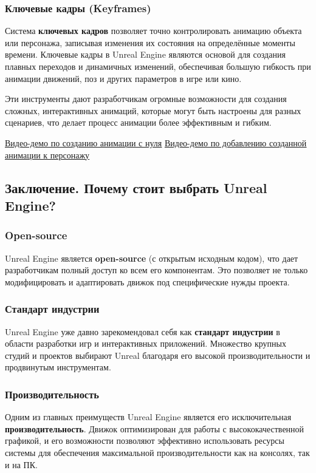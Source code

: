 \subsubsection{Ключевые кадры (Keyframes)}
Система \textbf{ключевых кадров} позволяет точно контролировать анимацию объекта или персонажа, записывая изменения их состояния на определённые моменты времени. Ключевые кадры в Unreal Engine являются основой для создания плавных переходов и динамичных изменений, обеспечивая большую гибкость при анимации движений, поз и других параметров в игре или кино.

Эти инструменты дают разработчикам огромные возможности для создания сложных, интерактивных анимаций, которые могут быть настроены для разных сценариев, что делает процесс анимации более эффективным и гибким.

\href{https://drive.google.com/file/d/1hCq_oF2frF_jmGwil24nNf5JegSw5t2a/view?usp=drive_link}{\underline{Видео-демо по созданию анимации с нуля}}
\newline
\href{https://drive.google.com/file/d/1bpvySAOp3d32BuroTV2EeSUZdUUCpDe9/view?usp=drive_link}{\underline{Видео-демо по добавлению созданной анимации к персонажу}}

\subsection{Заключение. Почему стоит выбрать Unreal Engine?}

\subsubsection{Open-source}
Unreal Engine является \textbf{open-source} (с открытым исходным кодом), что дает разработчикам полный доступ ко всем его компонентам. Это позволяет не только модифицировать и адаптировать движок под специфические нужды проекта.

\subsubsection{Стандарт индустрии}
Unreal Engine уже давно зарекомендовал себя как \textbf{стандарт индустрии} в области разработки игр и интерактивных приложений. Множество крупных студий и проектов выбирают Unreal благодаря его высокой производительности и продвинутым инструментам.

\subsubsection{Производительность}
Одним из главных преимуществ Unreal Engine является его исключительная \textbf{производительность}. Движок оптимизирован для работы с высококачественной графикой, и его возможности позволяют эффективно использовать ресурсы системы для обеспечения максимальной производительности как на консолях, так и на ПК.

